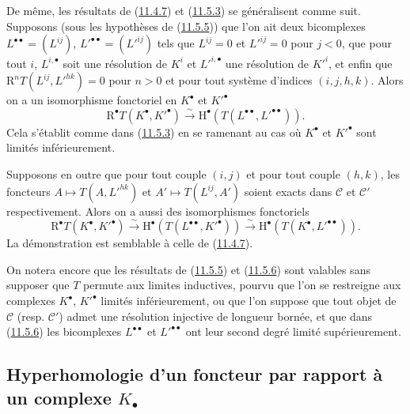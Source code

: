 \begin{env}[11.5.6]
\label{0.11.5.6-fr}
De même, les résultats de (\hyperref[0.11.4.7-fr]{11.4.7}) et
(\hyperref[0.11.5.3-fr]{11.5.3}) se généralisent comme suit. Supposons (sous
les hypothèses de (\hyperref[0.11.5.5-fr]{11.5.5})) que l'on ait deux
bicomplexes $L^{\bullet\bullet}=(L^{ij})$,
$L'^{\bullet\bullet}=(L'^{ij})$ tels que $L^{ij}=0$ et $L'^{ij}=0$ pour
$j<0$, que pour tout $i$, $L^{i,\bullet}$ soit une résolution de $K^i$ et
$L'^{i,\bullet}$ une résolution de $K'^i$, et enfin que
$\mathrm R^nT(L^{ij},L'^{hk})=0$ pour $n>0$ et pour tout système d'indices
$(i,j,h,k)$. Alors on a un isomorphisme fonctoriel en $K^\bullet$ et
$K'^\bullet$
\[
  \label{0.11.5.6.1-fr}
  \mathrm R^\bullet T(K^\bullet,K'^\bullet)\xrightarrow{\sim}
  \mathrm H^\bullet(T(L^{\bullet\bullet},L'^{\bullet\bullet})).
  \tag{11.5.6.1}
\]
Cela s'établit comme dans (\hyperref[0.11.5.3-fr]{11.5.3}) en se ramenant au
cas où $K^\bullet$ et $K'^\bullet$ sont limités inférieurement.

Supposons en outre que pour tout couple $(i,j)$ et pour tout couple $(h,k)$,
les foncteurs $A\mapsto T(A,L'^{hk})$ et $A'\mapsto T(L^{ij},A')$ soient
exacts dans $\mathcal C$ et $\mathcal C'$ respectivement. Alors on a aussi des
isomorphismes fonctoriels
\[
  \label{0.11.5.6.2-fr}
  \mathrm R^\bullet T(K^\bullet,K'^\bullet)
  \xrightarrow{\sim}\mathrm H^\bullet(T(L^{\bullet\bullet},K'^\bullet))
  \xrightarrow{\sim}\mathrm H^\bullet(T(K^\bullet,L'^{\bullet\bullet})).
  \tag{11.5.6.2}
\]
La démonstration est semblable à celle de
(\hyperref[0.11.4.7-fr]{11.4.7}).
\end{env}

\begin{env}[11.5.7]
\label{0.11.5.7-fr}
On notera encore que les résultats de (\hyperref[0.11.5.5-fr]{11.5.5}) et
(\hyperref[0.11.5.6-fr]{11.5.6}) sont valables sans supposer que $T$ permute
aux limites inductives, pourvu que l'on se restreigne aux complexes
$K^\bullet$, $K'^\bullet$ limités inférieurement, ou que l'on suppose que tout
objet de $\mathcal C$ (resp. $\mathcal C'$) admet une résolution injective de
longueur bornée, et que dans (\hyperref[0.11.5.6-fr]{11.5.6}) les bicomplexes
$L^{\bullet\bullet}$ et $L'^{\bullet\bullet}$ ont leur second degré limité
supérieurement.
\end{env}

\subsection{Hyperhomologie d'un foncteur par rapport à un complexe
$K_\bullet$}
\label{subsection:0.11.6-fr}

